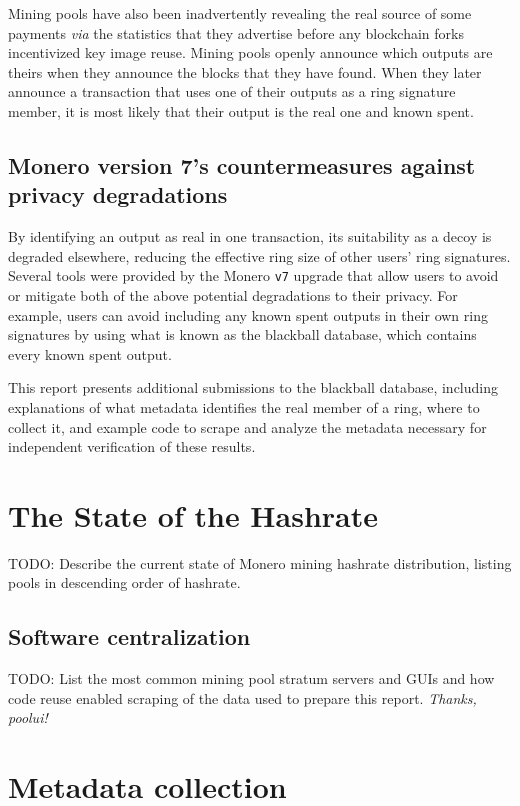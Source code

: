 \documentclass[notitlepage]{report}
\begin{document}
Mining pools have also been inadvertently revealing the real source of some payments \textit{via} the statistics that they advertise before any blockchain forks incentivized key image reuse.  Mining pools openly announce which outputs are theirs when they announce the blocks that they have found.  When they later announce a transaction that uses one of their outputs as a ring signature member, it is most likely that their output is the real one and known spent.

\subsection{Monero version 7's countermeasures against privacy degradations}

By identifying an output as real in one transaction, its suitability as a decoy is degraded elsewhere, reducing the effective ring size of other users' ring signatures.  Several tools were provided by the Monero \verb/v7/ upgrade that allow users to avoid or mitigate both of the above potential degradations to their privacy.  For example, users can avoid including any known spent outputs in their own ring signatures by using what is known as the blackball database, which contains every known spent output.

This report presents additional submissions to the blackball database, including explanations of what metadata identifies the real member of a ring, where to collect it, and example code to scrape and analyze the metadata necessary for independent verification of these results.

\section{The State of the Hashrate}

TODO: Describe the current state of Monero mining hashrate distribution, listing pools in descending order of hashrate.

\subsection{Software centralization}

TODO: List the most common mining pool stratum servers and GUIs and how code reuse enabled scraping of the data used to prepare this report.  \textit{Thanks, poolui!}

\section{Metadata collection}
\end{document}
